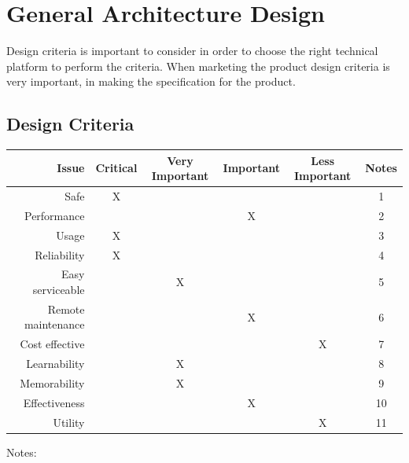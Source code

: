 \section{General Architecture Design}
Design criteria is important to consider in order to choose the right technical platform to perform the criteria. When marketing the product design criteria is very important, in making the specification for the product.
\subsection{Design Criteria}
\begin{table}[H]
	\begin{tabular}{| r | c | c | c | c | c |}
	\hline
		Issue 					& Critical 	& Very Important 	& Important	& Less Important	& Notes \\ \hline
		Safe					& X 		& ~ 				& ~			& ~ 				& 1 \\ \hline
		Performance 			& ~			& ~ 				& X 		& ~ 				& 2 \\ \hline
		Usage 					& X 		& ~ 				& ~ 		& ~ 				& 3 \\ \hline
		Reliability 			& X 		& ~ 				& ~ 		& ~ 				& 4 \\ \hline
		Easy serviceable 		& ~ 		& X 				& ~ 		& ~ 				& 5 \\ \hline
		Remote maintenance 		& ~ 		& ~ 				& X 		& ~ 				& 6 \\ \hline
		Cost effective 			& ~ 		& ~ 				& ~ 		& X 				& 7 \\ \hline
		Learnability			& ~ 		& X 				& ~ 		& ~ 				& 8 \\ \hline
		Memorability			& ~ 		& X 				& ~ 		& ~ 				& 9 \\ \hline
		Effectiveness			& ~ 		& ~ 				& X 		& ~ 				& 10 \\ \hline
		Utility					& ~ 		& ~ 				& ~ 		& X 				& 11 \\ \hline
	\end{tabular}
	\end{table}
Notes:
